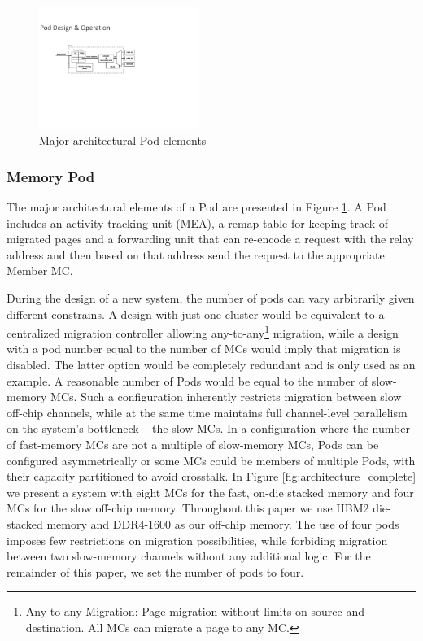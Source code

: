 \begin{figure}[h]
  \includegraphics[width=0.46\textwidth]{figures/pod_design.pdf}
  \caption{Major architectural Pod elements}
  \label{fig:architecture_pod}
\end{figure}

\subsubsection*{Memory Pod}
The major architectural elements of a Pod are presented in Figure \ref{fig:architecture_pod}. A Pod includes an activity tracking unit (MEA), a remap table for keeping track of migrated pages and a forwarding unit that can re-encode a request with the relay address and then based on that address send the request to the appropriate Member MC.

During the design of a new system, the number of pods can vary arbitrarily given different constrains. A design with just one cluster would be equivalent to a centralized migration controller allowing any-to-any\footnote{Any-to-any Migration: Page migration without limits on source and destination. All MCs can migrate a page to any MC.} migration, while a design with a pod number equal to the number of MCs would imply that migration is disabled. The latter option would be completely redundant and is only used as an example. A reasonable number of Pods would be equal to the number of slow-memory MCs. Such a configuration inherently restricts migration between slow off-chip channels, while at the same time maintains full channel-level parallelism on the system's bottleneck -- the slow MCs. In a configuration where the number of fast-memory MCs are not a multiple of slow-memory MCs, Pods can be configured asymmetrically or some MCs could be members of multiple Pods, with their capacity partitioned to avoid crosstalk. In Figure \ref{fig:architecture_complete} we present a system with eight MCs for the fast, on-die stacked memory and four MCs for the slow off-chip memory. Throughout this paper we use HBM2 die-stacked memory  and DDR4-1600 as our off-chip memory. The use of four pods imposes few restrictions on migration possibilities, while forbiding migration between two slow-memory channels without any additional logic. For the remainder of this paper, we set the number of pods to four.

